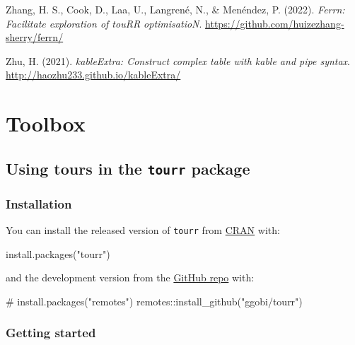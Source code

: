 \documentclass[
  letterpaper,
]{krantz}
\newenvironment{Shaded}{\begin{snugshade}}{\end{snugshade}}
\newcommand{\CommentTok}[1]{\textcolor[rgb]{0.37,0.37,0.37}{#1}}
\newcommand{\FunctionTok}[1]{\textcolor[rgb]{0.28,0.35,0.67}{#1}}
\newcommand{\NormalTok}[1]{\textcolor[rgb]{0.00,0.23,0.31}{#1}}
\newcommand{\SpecialCharTok}[1]{\textcolor[rgb]{0.37,0.37,0.37}{#1}}
\newcommand{\StringTok}[1]{\textcolor[rgb]{0.13,0.47,0.30}{#1}}
\newlength{\cslhangindent}
\newenvironment{CSLReferences}[2] %
 {\begin{list}{}{%
  \setlength{\itemindent}{0pt}
  \setlength{\leftmargin}{0pt}
  \setlength{\parsep}{0pt}
  \ifodd #1
   \setlength{\leftmargin}{\cslhangindent}
   \setlength{\itemindent}{-1\cslhangindent}
  \fi
  \setlength{\itemsep}{#2\baselineskip}}}
 {\end{list}}
\begin{document}
\begin{CSLReferences}{1}{0}
Zhang, H. S., Cook, D., Laa, U., Langrené, N., \& Menéndez, P. (2022).
\emph{Ferrn: Facilitate exploration of touRR optimisatioN}.
\url{https://github.com/huizezhang-sherry/ferrn/}

Zhu, H. (2021). \emph{kableExtra: Construct complex table with kable and
pipe syntax}. \url{http://haozhu233.github.io/kableExtra/}

\end{CSLReferences}

\cleardoublepage
{}
{}
\appendix

\chapter{Toolbox}\label{toolbox}

\section{\texorpdfstring{Using tours in the \texttt{tourr}
package}{Using tours in the tourr package}}\label{using-tours-in-the-tourr-package}

\subsection{Installation}\label{installation}

You can install the released version of \texttt{tourr} from
\href{https://CRAN.R-project.org}{CRAN} with:

\begin{Shaded}
\begin{Highlighting}[]
\FunctionTok{install.packages}\NormalTok{(}\StringTok{"tourr"}\NormalTok{)}
\end{Highlighting}
\end{Shaded}

and the development version from the
\href{https://github.com/ggobi/tourr}{GitHub repo} with:

\begin{Shaded}
\begin{Highlighting}[]
\CommentTok{\# install.packages("remotes")}
\NormalTok{remotes}\SpecialCharTok{::}\FunctionTok{install\_github}\NormalTok{(}\StringTok{"ggobi/tourr"}\NormalTok{)}
\end{Highlighting}
\end{Shaded}

\subsection{Getting started}\label{getting-started}
\end{document}
